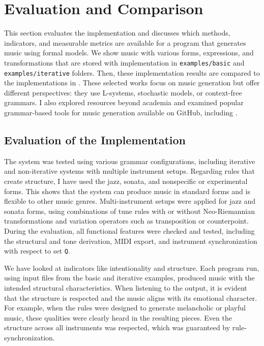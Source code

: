 \section{Evaluation and Comparison}
This section evaluates the implementation and discusses which methods, indicators, and measurable metrics are available for a program that generates music using formal models. We show music with various forms, expressions, and transformations that are stored with implementation in \texttt{examples/basic} and \texttt{examples/iterative} folders. Then, these implementation results are compared to the implementations in \cite{eibensteiner2018procedural, melkonian_music_language, gramimprovisation, bachelorthesis}. These selected works focus on music generation but offer different perspectives: they use L-systems, stochastic models, or context-free grammars. I also explored resources beyond academia and examined popular grammar-based tools for music generation available on GitHub, including \cite{ave-llan_music_machine, halleyyoung_generative_grammar_music, kwon-young_music_notation_grammar}.

\subsection*{Evaluation of the Implementation}
The system was tested using various grammar configurations, including iterative and non-iterative systems with multiple instrument setups. Regarding rules that create structure, I have used the jazz, sonata, and nonspecific or experimental forms. This shows that the system can produce music in standard forms and is flexible to other music genres. Multi-instrument setups were applied for jazz and sonata forms, using combinations of tune rules with or without Neo-Riemannian transformations and variation operators such as transposition or counterpoint. During the evaluation, all functional features were checked and tested, including the structural and tone derivation, MIDI export, and instrument synchronization with respect to set \texttt{Q}.

We have looked at indicators like intentionality and structure. Each program run, using input files from the basic and iterative examples, produced music with the intended structural characteristics. When listening to the output, it is evident that the structure is respected and the music aligns with its emotional character. For example, when the rules were designed to generate melancholic or playful music, these qualities were clearly heard in the resulting pieces. Even the structure across all instruments was respected, which was guaranteed by rule-synchronization.

